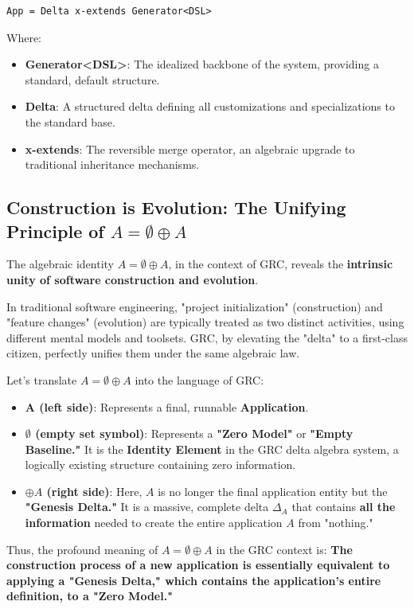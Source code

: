 \documentclass[11pt]{article}
\begin{document}
\begin{verbatim}
App = Delta x-extends Generator<DSL>
\end{verbatim}

Where:
\begin{itemize}
    \item \textbf{Generator<DSL>}: The idealized backbone of the system, providing a standard, default structure.
    \item \textbf{Delta}: A structured delta defining all customizations and specializations to the standard base.
    \item \textbf{x-extends}: The reversible merge operator, an algebraic upgrade to traditional inheritance mechanisms.
\end{itemize}

\subsection{Construction is Evolution: The Unifying Principle of $A = \emptyset \oplus A$}

The algebraic identity $A = \emptyset \oplus A$, in the context of GRC, reveals the \textbf{intrinsic unity of software construction and evolution}.

In traditional software engineering, "project initialization" (construction) and "feature changes" (evolution) are typically treated as two distinct activities, using different mental models and toolsets. GRC, by elevating the "delta" to a first-class citizen, perfectly unifies them under the same algebraic law.

Let's translate $A = \emptyset \oplus A$ into the language of GRC:
\begin{itemize}
    \item \textbf{A (left side)}: Represents a final, runnable \textbf{Application}.
    \item \textbf{$\emptyset$ (empty set symbol)}: Represents a \textbf{"Zero Model"} or \textbf{"Empty Baseline."} It is the \textbf{Identity Element} in the GRC delta algebra system, a logically existing structure containing zero information.
    \item \textbf{$\oplus A$ (right side)}: Here, $A$ is no longer the final application entity but the \textbf{"Genesis Delta."} It is a massive, complete delta $\Delta_A$ that contains \textbf{all the information} needed to create the entire application $A$ from "nothing."
\end{itemize}

Thus, the profound meaning of $A = \emptyset \oplus A$ in the GRC context is:
\textbf{The construction process of a new application is essentially equivalent to applying a "Genesis Delta," which contains the application's entire definition, to a "Zero Model."}
\end{document}
